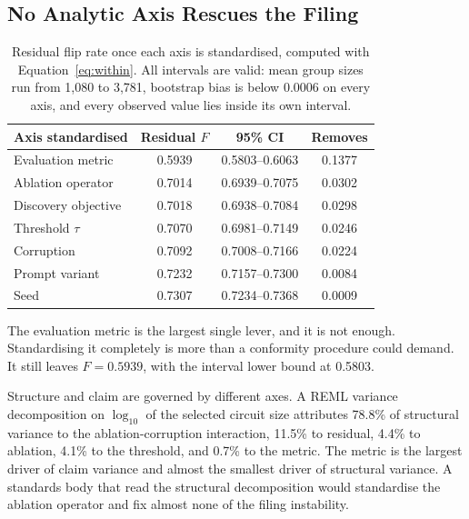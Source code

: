 \documentclass[letterpaper]{article} %
\begin{document}
\subsection{No Analytic Axis Rescues the Filing}

\begin{table}[t]
\centering
\caption{Residual flip rate once each axis is standardised, computed with
Equation~\ref{eq:within}. All intervals are valid: mean group sizes run from
1{,}080 to 3{,}781, bootstrap bias is below 0.0006 on every axis, and every
observed value lies inside its own interval.}
\label{tab:fixed}
\small\setlength{\tabcolsep}{4pt}
\begin{tabular}{lccc}
\toprule
Axis standardised & Residual $F$ & 95\% CI & Removes \\
\midrule
Evaluation metric & 0.5939 & 0.5803--0.6063 & 0.1377 \\
Ablation operator & 0.7014 & 0.6939--0.7075 & 0.0302 \\
Discovery objective & 0.7018 & 0.6938--0.7084 & 0.0298 \\
Threshold $\tau$ & 0.7070 & 0.6981--0.7149 & 0.0246 \\
Corruption & 0.7092 & 0.7008--0.7166 & 0.0224 \\
Prompt variant & 0.7232 & 0.7157--0.7300 & 0.0084 \\
Seed & 0.7307 & 0.7234--0.7368 & 0.0009 \\
\bottomrule
\end{tabular}
\end{table}

The evaluation metric is the largest single lever, and it is not enough.
Standardising it completely is more than a conformity procedure could demand. It
still leaves $F = 0.5939$, with the interval lower bound at 0.5803.

Structure and claim are governed by different axes. A REML variance
decomposition on $\log_{10}$ of the selected circuit size attributes 78.8\% of
structural variance to the ablation-corruption interaction, 11.5\% to residual,
4.4\% to ablation, 4.1\% to the threshold, and 0.7\% to the metric. The metric is
the largest driver of claim variance and almost the smallest driver of
structural variance. A standards body that read the structural decomposition
would standardise the ablation operator and fix almost none of the filing
instability.
\end{document}

